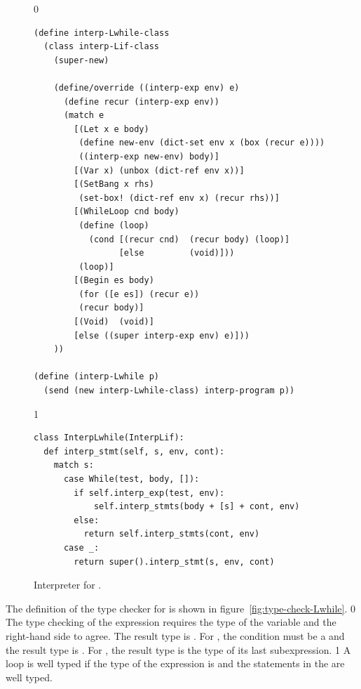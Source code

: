 \documentclass[7x10]{TimesAPriori_MIT}%
\def\racketEd{0}
\def\pythonEd{1}
\def\edition{1}
\newcommand{\pythonColor}[0]{}
\numberwithin{theorem}{chapter}
\numberwithin{definition}{chapter}
\numberwithin{equation}{chapter}
\begin{document}
\begin{figure}[tbp]
\begin{tcolorbox}[colback=white]  
{\if\edition\racketEd    
\begin{lstlisting}[basicstyle=\ttfamily\footnotesize]
(define interp-Lwhile-class
  (class interp-Lif-class
    (super-new)

    (define/override ((interp-exp env) e)
      (define recur (interp-exp env))
      (match e
        [(Let x e body)
         (define new-env (dict-set env x (box (recur e))))
         ((interp-exp new-env) body)]
        [(Var x) (unbox (dict-ref env x))]
        [(SetBang x rhs)
         (set-box! (dict-ref env x) (recur rhs))]
        [(WhileLoop cnd body)
         (define (loop)
           (cond [(recur cnd)  (recur body) (loop)]
                 [else         (void)]))
         (loop)]
        [(Begin es body)
         (for ([e es]) (recur e))
         (recur body)]
        [(Void)  (void)]
        [else ((super interp-exp env) e)]))
    ))

(define (interp-Lwhile p)
  (send (new interp-Lwhile-class) interp-program p))
\end{lstlisting}
\fi}
{\if\edition\pythonEd\pythonColor
\begin{lstlisting}
class InterpLwhile(InterpLif):
  def interp_stmt(self, s, env, cont):
    match s:
      case While(test, body, []):
        if self.interp_exp(test, env):
            self.interp_stmts(body + [s] + cont, env)
        else:
          return self.interp_stmts(cont, env)
      case _:
        return super().interp_stmt(s, env, cont)
\end{lstlisting}
\fi}
\end{tcolorbox}

\caption{Interpreter for \LangLoop{}.}
\label{fig:interp-Lwhile}
\end{figure}

The definition of the type checker for \LangLoop{} is shown in
figure~\ref{fig:type-check-Lwhile}.
%
{\if\edition\racketEd    
%
The type checking of the  expression requires the type
of the variable and the right-hand side to agree. The result type is
. For , the condition must be a \BOOLTY{}
and the result type is .  For , the result type
is the type of its last subexpression.
%
\fi}
%
{\if\edition\pythonEd\pythonColor
%
A  loop is well typed if the type of the 
expression is  and the statements in the  are
well typed.
%
\fi}
\end{document}

